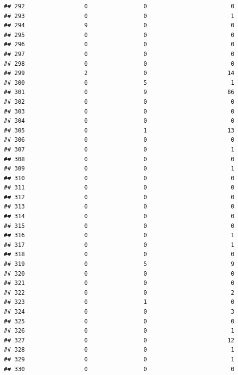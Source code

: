 \documentclass[
]{article}
\begin{document}
\begin{verbatim}
## 292                 0                0                        0
## 293                 0                0                        1
## 294                 9                0                        0
## 295                 0                0                        0
## 296                 0                0                        0
## 297                 0                0                        0
## 298                 0                0                        0
## 299                 2                0                       14
## 300                 0                5                        1
## 301                 0                9                       86
## 302                 0                0                        0
## 303                 0                0                        0
## 304                 0                0                        0
## 305                 0                1                       13
## 306                 0                0                        0
## 307                 0                0                        1
## 308                 0                0                        0
## 309                 0                0                        1
## 310                 0                0                        0
## 311                 0                0                        0
## 312                 0                0                        0
## 313                 0                0                        0
## 314                 0                0                        0
## 315                 0                0                        0
## 316                 0                0                        1
## 317                 0                0                        1
## 318                 0                0                        0
## 319                 0                5                        9
## 320                 0                0                        0
## 321                 0                0                        0
## 322                 0                0                        2
## 323                 0                1                        0
## 324                 0                0                        3
## 325                 0                0                        0
## 326                 0                0                        1
## 327                 0                0                       12
## 328                 0                0                        1
## 329                 0                0                        1
## 330                 0                0                        0

\end{verbatim}
\end{document}
